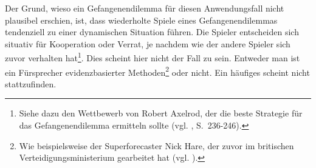 Der Grund, wieso ein Gefangenendilemma für diesen Anwendungsfall nicht plausibel erschien, ist, dass wiederholte Spiele
eines Gefangenendilemmas tendenziell zu einer dynamischen Situation führen. Die Spieler entscheiden sich situativ für
Kooperation oder Verrat, je nachdem wie der andere Spieler sich zuvor verhalten hat\footnote{
Siehe dazu den Wettbewerb von Robert Axelrod, der die beste Strategie für das Gefangenendilemma ermitteln sollte
(vgl. \cite{Poundstone}, S.~236-246).
}. Dies scheint hier nicht der Fall zu sein. Entweder man ist ein Fürsprecher evidenzbasierter Methoden\footnote{
Wie beispielsweise der Superforecaster Nick Hare, der zuvor im britischen Verteidigungsministerium gearbeitet hat (vgl. \cite{Burton}).
} oder nicht. Ein häufiges \grqq{} scheint nicht stattzufinden.



